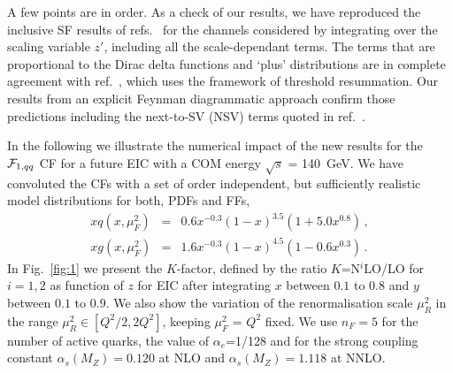 \documentclass[%
 twocolumn,
 superscriptaddress,
 preprintnumbers,
 nofootinbib,
 amsmath,amssymb,
 aps,
 prl,
]{revtex4}
\begin{document}
A few points are in order. As a check of our results, we have reproduced the inclusive SF results of refs.~\cite{Zijlstra:1992qd,vanNeerven:1991nn} for the channels considered by integrating over the scaling variable $z'$, including all the
scale-dependant terms.
The terms that are proportional to the Dirac delta functions and `plus' distributions are in complete agreement with ref.~\cite{Abele:2021nyo}, which uses the framework of threshold resummation. 
Our results from an explicit Feynman diagrammatic approach confirm those predictions including the next-to-SV (NSV) terms quoted in ref.~\cite{Abele:2021nyo}.

In the following we illustrate the numerical impact of the new results for the  ${\cal F}_{1,qq}$ CF for a future EIC with a COM energy $\sqrt{s}$ = 140~GeV.
We have convoluted the CFs with a set of order independent, but sufficiently realistic model distributions for both, PDFs and FFs, 
%
\begin{eqnarray}
xq(x,\mu_F^2)&=& 0.6 x^{-0.3}(1-x)^{3.5}(1 + 5.0x^{0.8})\, ,\nonumber \\
xg(x,\mu_F^2)&=& 1.6 x^{-0.3}(1-x)^{4.5}(1 - 0.6x^{0.3})
\, .
\end{eqnarray}
%
In Fig.~\ref{fig:1} we present the $K$-factor, defined by the ratio
$K$=N$^i$LO/LO for $i=1,2$ as function of $z$ 
for EIC after integrating $x$ between $0.1$ to $0.8$ and $y$ between $0.1$ to $0.9$. 
We also show the variation of the renormalisation scale $\mu_R^2$ 
in the range $\mu_R^2 \in [Q^2/2,2Q^2]$, keeping $\mu_F^2$ = $Q^2$ fixed. 
We use $n_F=5$ for the number of active quarks, the value of $\alpha_e$=1/128 and for the strong coupling constant $\alpha_s(M_Z)= 0.120$ at NLO and $\alpha_s(M_Z)= 1.118$ at NNLO.
\end{document}
